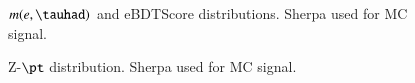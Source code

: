\begin{figure}[h!tbp]
	\centering
	\hfill
	\caption{$m(e,\tauhad)$ and eBDTScore distributions. Sherpa used for MC signal.}
\label{AFig7S}
\end{figure} 

\begin{figure}[h!tbp]
	\centering
	\hfill
	\caption{Z-$\pt$ distribution. Sherpa used for MC signal.}
	\label{AFig8S}
\end{figure} 

